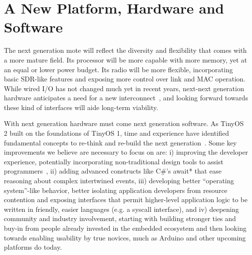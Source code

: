 \section{A New Platform, Hardware and Software}

The next generation mote will reflect the diversity and flexibility that comes
with a more mature field. Its processor will be more capable with more memory,
yet at an equal or lower power budget. Its radio will be more flexible,
incorporating basic SDR-like features and exposing more control over link and
MAC operation. While wired I/O has not changed much yet in recent years,
next-next generation hardware anticipates a need for a new
interconnect~\cite{kuo14mbus}, and looking forward towards these kind of
interfaces will aide long-term viability.

With next generation hardware must come next generation software. As TinyOS 2
built on the foundations of TinyOS 1, time and experience have identified
fundamental concepts to re-think and re-build the next
generation~\cite{tinyos-retrospective}. Some key improvements we believe are
necessary to focus on are: i) improving the developer experience, potentially
incorporating non-traditional design tools to assist
programmers~\cite{brown-bubbles}, ii) adding advanced constructs like C\#'s
await* that ease reasoning about complex intertwined events, iii) developing
better “operating system”-like behavior, better isolating application
developers from resource contention and exposing interfaces that permit
higher-level application logic to be written in friendly, easier languages
(e.g. a syscall interface), and iv) deepening community and industry
involvement, starting with building stronger ties and buy-in from people
already invested in the embedded ecosystem and then looking towards enabling
usability by true novices, much as Arduino and other upcoming platforms do
today.

% 
% 
% 
% 
% 

